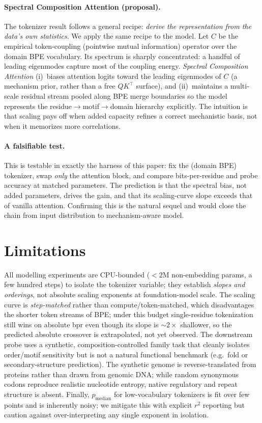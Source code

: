 \documentclass[11pt]{article}
\begin{document}
\paragraph{Spectral Composition Attention (proposal).}
The tokenizer result follows a general recipe: \emph{derive the representation
from the data's own statistics}. We apply the same recipe to the model. Let
$C$ be the empirical token-coupling (pointwise mutual information) operator over
the domain BPE vocabulary. Its spectrum is sharply concentrated: a handful of
leading eigenmodes capture most of the coupling energy. \emph{Spectral
Composition Attention} (i)~biases attention logits toward the leading eigenmodes
of $C$ (a mechanism prior, rather than a free $QK^\top$ surface), and
(ii)~maintains a multi-scale residual stream pooled along BPE merge boundaries so
the model represents the residue$\to$motif$\to$domain hierarchy explicitly. The
intuition is that scaling pays off when added capacity refines a correct
mechanistic basis, not when it memorizes more correlations.

\paragraph{A falsifiable test.}
This is testable in exactly the harness of this paper: fix the (domain BPE)
tokenizer, swap \emph{only} the attention block, and compare bits-per-residue and
probe accuracy at matched parameters. The prediction is that the spectral bias,
not added parameters, drives the gain, and that its scaling-curve slope exceeds
that of vanilla attention. Confirming this is the natural sequel and would close
the chain from input distribution to mechanism-aware model.

\section{Limitations}
All modelling experiments are CPU-bounded ($<\!2$M non-embedding params, a few
hundred steps) to isolate the tokenizer variable; they establish \emph{slopes and
orderings}, not absolute scaling exponents at foundation-model scale. The scaling
curve is \emph{step-matched} rather than compute/token-matched, which disadvantages
the shorter token streams of BPE; under this budget single-residue tokenization
still wins on absolute bpr even though its slope is $\sim\!2\times$ shallower, so
the predicted absolute crossover is extrapolated, not yet observed. The downstream
probe uses a synthetic, composition-controlled family task that cleanly isolates
order/motif sensitivity but is not a natural functional benchmark (e.g.\ fold or
secondary-structure prediction). The synthetic genome is reverse-translated from
proteins rather than drawn from genomic DNA; while random synonymous codons
reproduce realistic nucleotide entropy, native regulatory and repeat structure is
absent. Finally, $p_{\text{median}}$ for low-vocabulary tokenizers is fit over few
points and is inherently noisy; we mitigate this with explicit $r^2$ reporting but
caution against over-interpreting any single exponent in isolation.
\end{document}
